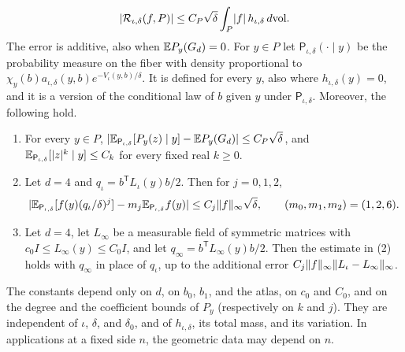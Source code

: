 \begin{lemma}
\begin{equation}
\begin{gathered}
 \lvert \mathcal R_{\iota,\delta}(f,P)\rvert\le C_P\sqrt\delta\int_P\lvert f\rvert\,h_{\iota,\delta}\,d\mathrm{vol}.
\end{gathered}
\end{equation}
The error is additive, also when $\mathbb E P_y(G_d)=0$. For $y\in P$ let $\mathsf P_{\iota,\delta}(\cdot\mid y)$ be the probability measure on the fiber with density proportional to $\chi_y(b)a_{\iota,\delta}(y,b)e^{-V_\iota(y,b)/\delta}$. It is defined for every $y$, also where $h_{\iota,\delta}(y)=0$, and it is a version of the conditional law of $b$ given $y$ under $\mathsf P_{\iota,\delta}$. Moreover, the following hold.
\begin{enumerate}
\item For every $y\in P$, $\lvert \mathbb E_{\mathsf P_{\iota,\delta}}[P_y(z)\mid y]-\mathbb E P_y(G_d)\rvert\le C_P\sqrt\delta$, and $\mathbb E_{\mathsf P_{\iota,\delta}}[\lvert z\rvert^k\mid y]\le C_k$ for every fixed real $k\ge0$.
\item Let $d=4$ and $q_\iota=b^{\mathsf T}L_\iota(y)b/2$. Then for $j=0,1,2$,
\[
 \lvert \mathbb E_{\mathsf P_{\iota,\delta}}[f(y)(q_\iota/\delta)^j]-m_j\mathbb E_{\mathsf P_{\iota,\delta}}f(y)\rvert\le C_j\lVert f\rVert_\infty\sqrt\delta,\qquad(m_0,m_1,m_2)=(1,2,6).
\]
\item Let $d=4$, let $L_\infty$ be a measurable field of symmetric matrices with $c_0I\le L_\infty(y)\le C_0I$, and let $q_\infty=b^{\mathsf T}L_\infty(y)b/2$. Then the estimate in (2) holds with $q_\infty$ in place of $q_\iota$, up to the additional error $C_j\lVert f\rVert_\infty\lVert L_\iota-L_\infty\rVert_\infty$.
\end{enumerate}
The constants depend only on $d$, on $b_0$, $b_1$, and the atlas, on $c_0$ and $C_0$, and on the degree and the coefficient bounds of $P_y$ (respectively on $k$ and $j$). They are independent of $\iota$, $\delta$, and $\delta_0$, and of $h_{\iota,\delta}$, its total mass, and its variation. In applications at a fixed side $n$, the geometric data may depend on $n$.
\end{lemma}

